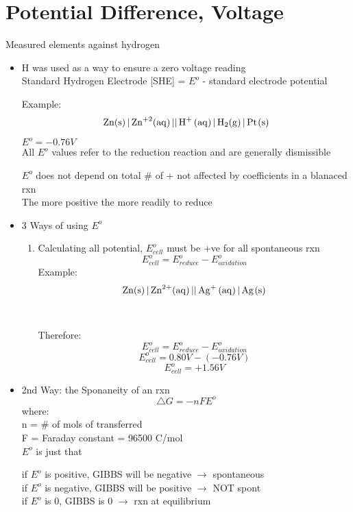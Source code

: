 \documentclass{article}
\begin{document}
\section{Potential Difference, Voltage}
Measured elements against hydrogen
\begin{itemize}
\item H was used as a way to ensure a zero voltage reading \\Standard Hydrogen Electrode [SHE] = $E^{o}$ - standard electrode potential

Example:$$\ce{Zn(s) | Zn^{+2}(aq) || H+ (aq) | H2(g) | Pt(s)}$$

$E^{o} = -0.76V$\\All $E^{o}$ values refer to the reduction reaction and are generally dismissible

$E^{o}$ does not depend on total \# of  + not affected by coefficients in a blanaced rxn\\The more positive the more readily to reduce

\item 3 Ways of using $E^{o}$
\begin{enumerate}
\item Calculating all potential, $E^{o}_{cell}$ must be +ve for all spontaneous rxn
$$E^{o}_{cell} = E^{o}_{reduce} - E^{o}_{oxidation}$$
Example: $$\ce{Zn(s) | Zn^{2+}(aq) || Ag+ (aq) | Ag(s)}$$
\\
\\
Therefore:
$$E^{o}_{cell} = E^{o}_{reduce} - E^{o}_{oxidation}$$
$$E^{o}_{cell} = 0.80V - (-0.76V)$$
$$E^{o}_{cell} = + 1.56V$$
\end{enumerate}

\item 2nd Way: the Sponaneity of an rxn
$$\triangle{G} = -nFE^{o}$$
where:\\n = \# of mols of  transferred\\F = Faraday constant = 96500 C/mol\\$E^{o}$ is just that

if $E^{o}$ is positive, GIBBS will be negative $\rightarrow$ spontaneous\\
if $E^{o}$ is negative, GIBBS will be positive $\rightarrow$ NOT spont\\
if $E^{o}$ is 0, GIBBS is 0 $\rightarrow$ rxn at equilibrium

\end{itemize}
\end{document}
